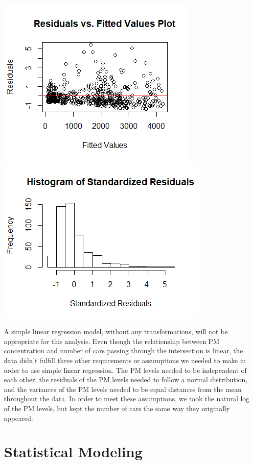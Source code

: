 \documentclass[12pt]{article}\usepackage[]{graphicx}\usepackage[]{color}
\begin{document}
\includegraphics[scale=0.8]{falseresidsvsfitted.png}
\includegraphics[scale=0.8]{falsehistogram.png}


A simple linear regression model, without any transformations, will not be appropriate for this analysis. Even though the relationship between PM concentration and number of cars passing through the intersection is linear, the data didn't fulfill three other requirements or assumptions we needed to make in order to use simple linear regression. The PM levels needed to be independent of each other, the residuals of the PM levels needed to follow a normal distribution, and the variances of the PM levels needed to be equal distances from the mean throughout the data. In order to meet these assumptions, we took the natural log of the PM levels, but kept the number of cars the same way they originally appeared. 




\section{Statistical Modeling}
\end{document}
